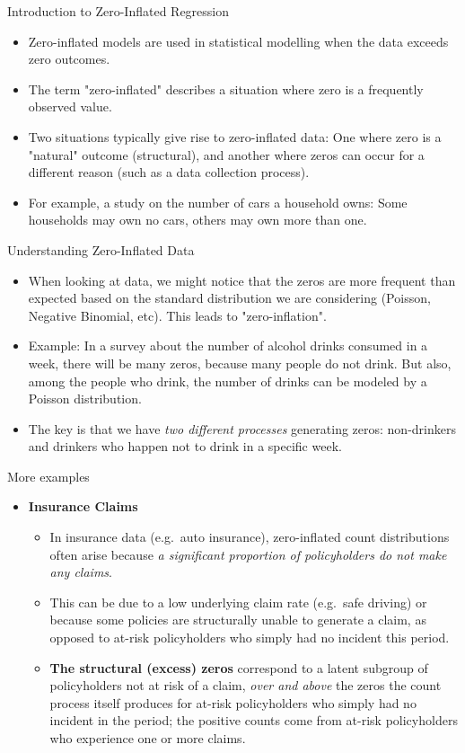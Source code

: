 \documentclass[10pt,ignorenonframetext,aspectratio=169]{beamer}
\begin{document}
\begin{frame}{Introduction to Zero-Inflated Regression}
\begin{itemize}
\justifying
\item Zero-inflated models are used in statistical modelling when the data exceeds zero outcomes.
\item The term "zero-inflated" describes a situation where zero is a frequently observed value.
\item Two situations typically give rise to zero-inflated data: One where zero is a "natural" outcome (structural), and another where zeros can occur for a different reason (such as a data collection process).
\item For example, a study on the number of cars a household owns: Some households may own no cars, others may own more than one.
\end{itemize}
\end{frame}

\begin{frame}{Understanding Zero-Inflated Data}
\begin{itemize}
\justifying
\item When looking at data, we might notice that the zeros are more frequent than expected based on the standard distribution we are considering (Poisson, Negative Binomial, etc). This leads to "zero-inflation".
\item Example: In a survey about the number of alcohol drinks consumed in a week, there will be many zeros, because many people do not drink. But also, among the people who drink, the number of drinks can be modeled by a Poisson distribution.
\item The key is that we have \textit{two different processes} generating zeros: non-drinkers and drinkers who happen not to drink in a specific week.
\end{itemize}
\end{frame}

\begin{frame}{More examples}
\begin{itemize}
\justifying
    \item \textbf{Insurance Claims}
    \begin{itemize}
        \item In insurance data (e.g.\ auto insurance), zero-inflated count distributions often arise because \textit{a significant proportion of policyholders do not make any claims}.
        \item This can be due to a low underlying claim rate (e.g.\ safe driving) or because some policies are structurally unable to generate a claim, as opposed to at-risk policyholders who simply had no incident this period.
        \item \textbf{The structural (excess) zeros} correspond to a latent subgroup of policyholders not at risk of a claim, \textit{over and above} the zeros the count process itself produces for at-risk policyholders who simply had no incident in the period; the positive counts come from at-risk policyholders who experience one or more claims.
    \end{itemize}
\end{itemize}
\end{frame}
\end{document}

